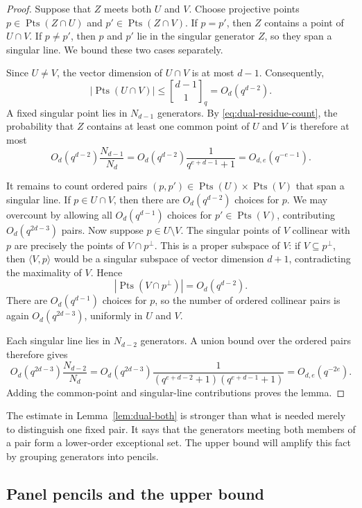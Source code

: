 \documentclass[11pt]{article}
\theoremstyle{definition}
\theoremstyle{remark}
\newcommand{\qbinom}[2]{\genfrac{[}{]}{0pt}{}{#1}{#2}_q}
\newcommand{\Pts}{\operatorname{Pts}}
\begin{document}
\begin{proof}
Suppose that $Z$ meets both $U$ and $V$.  Choose projective points
$p\in\Pts(Z\cap U)$ and $p'\in\Pts(Z\cap V)$.  If $p=p'$, then $Z$ 
contains
a point of $U\cap V$.  If $p\neq p'$, then $p$ and $p'$ lie in the 
singular
generator $Z$, so they span a singular line.  We bound these two cases
separately.

Since $U\neq V$, the vector dimension of $U\cap V$ is at most $d-1$.
Consequently,
\[
        |\Pts(U\cap V)|\leq\qbinom{d-1}{1}=O_d(q^{d-2}).
\]
A fixed singular point lies in $N_{d-1}$ generators.  By
\eqref{eq:dual-residue-count}, the probability that $Z$ contains at least 
one
common point of $U$ and $V$ is therefore at most
\[
        O_d(q^{d-2})\frac{N_{d-1}}{N_d}
        =O_d(q^{d-2})\frac{1}{q^{e+d-1}+1}
        =O_{d,e}(q^{-e-1}).
\]

It remains to count ordered pairs $(p,p')\in\Pts(U)\times\Pts(V)$ that 
span
a singular line.  If $p\in U\cap V$, then there are $O_d(q^{d-2})$ choices
for $p$.  We may overcount by allowing all $O_d(q^{d-1})$ choices for
$p'\in\Pts(V)$, contributing
$O_d(q^{2d-3})$ pairs.  Now suppose $p\in U\setminus V$.  The singular 
points
of $V$ collinear with $p$ are precisely the points of $V\cap p^\perp$.
This is a proper subspace of $V$: if $V\subseteq p^\perp$, then
$\langle V,p\rangle$ would be a singular subspace of vector dimension
$d+1$, contradicting the maximality of $V$.  Hence
\[
        |\Pts(V\cap p^\perp)|=O_d(q^{d-2}).
\]
There are $O_d(q^{d-1})$ choices for $p$, so the number of ordered 
collinear
pairs is again $O_d(q^{2d-3})$, uniformly in $U$ and $V$.

Each singular line lies in $N_{d-2}$ generators.  A union bound over the
ordered pairs therefore gives
\[
        O_d(q^{2d-3})\frac{N_{d-2}}{N_d}
        =O_d(q^{2d-3})
          \frac{1}{(q^{e+d-2}+1)(q^{e+d-1}+1)}
        =O_{d,e}(q^{-2e}).
\]
Adding the common-point and singular-line contributions proves the lemma.
\end{proof}


The estimate in Lemma~\ref{lem:dual-both} is stronger than what is needed
merely to distinguish one fixed pair.  It says that the generators meeting
both members of a pair form a lower-order exceptional set.  The upper 
bound
will amplify this fact by grouping generators into pencils.

\subsection{Panel pencils and the upper bound}
\end{document}

